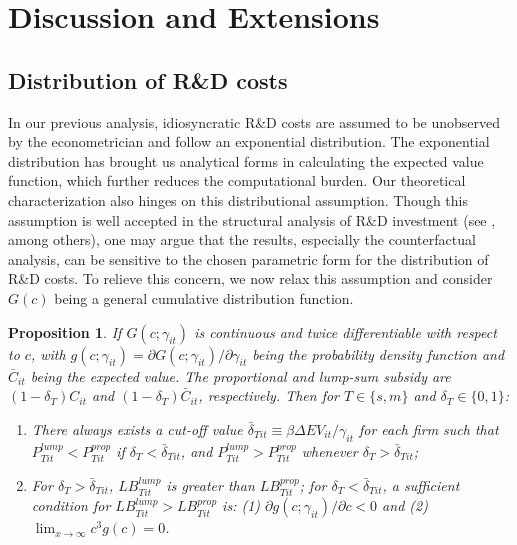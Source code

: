 \documentclass[11pt]{article}
\newtheorem{prop}{Proposition}
\begin{document}
\section{Discussion and Extensions}
\subsection{Distribution of R\&D costs} \label{RD_GenDist}
In our previous analysis, idiosyncratic R\&D costs are assumed to be unobserved by the econometrician and follow an exponential distribution. The exponential distribution has brought us analytical forms in calculating the expected value function, which further reduces the computational burden. Our theoretical characterization also hinges on this distributional assumption. Though this assumption is well accepted in the structural analysis of R\&D investment (see \cite{Awetal.2011,Peters2017rand}, among others), one may argue that the results, especially the counterfactual analysis, can be sensitive to the chosen parametric form for the distribution of R\&D costs. To relieve this concern, we now relax this assumption and consider $G(c)$ being a general cumulative distribution function. 

\begin{prop} \label{prop2}
    If $G(c;\gamma_{it})$ is continuous and twice differentiable with respect to $c$, with $g(c;\gamma_{it})=\partial G(c;\gamma_{it})/\partial \gamma_{it}$ being the probability density function and  $\bar{C}_{it}$ being the expected value. The proportional and lump-sum subsidy are $(1-\delta_T)C_{it}$ and  $(1-\delta_T)\bar{C}_{it}$, respectively. Then for $T\in\{s, m\}$ and $\delta_T\in\{0, 1\}$:
    \begin{enumerate}
        \item There always exists a cut-off value $\bar{\delta}_{Tit} \equiv \beta \Delta EV_{it}/\gamma_{it}$ for each firm such that $P_{Tit}^{lump}<P_{Tit}^{prop}$ if  $\delta_T<\bar{\delta}_{Tit} $, and $P_{Tit}^{lump}>P_{Tit}^{prop}$ whenever $\delta_T>\bar{\delta}_{Tit}$;
        \item For $\delta_T>\bar{\delta}_{Tit}$, $LB_{Tit}^{lump}$ is greater than $LB_{Tit}^{prop}$; for $\delta_T<\bar{\delta}_{Tit}$,  a sufficient condition for $LB_{Tit}^{lump}>LB_{Tit}^{prop}$ is: (1) $\partial g(c; \gamma_{it})/\partial c<0$ and (2) $\lim_{x\rightarrow \infty}c^3g(c)=0$.
    \end{enumerate}
\end{prop}
\end{document}
